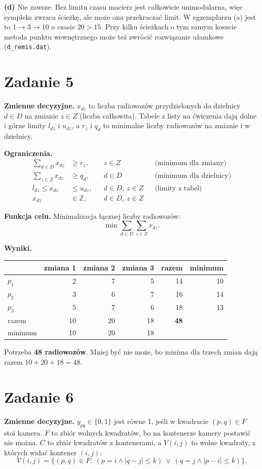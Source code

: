 \documentclass[11pt,a4paper]{article}
\begin{document}
\textbf{(d)} Nie zawsze. Bez limitu czasu macierz jest całkowicie unimodularna, więc sympleks zwraca ścieżkę, ale może ona przekraczać limit. W egzemplarzu (a) jest to $1\to3\to10$ o czasie $20>15$. Przy kilku ścieżkach o tym samym koszcie metoda punktu wewnętrznego może też zwrócić rozwiązanie ułamkowe (\texttt{d\_remis.dat}).

\section*{Zadanie 5}
\textbf{Zmienne decyzyjne.} $x_{dz}$ to liczba radiowozów przydzielonych do dzielnicy $d\in D$ na zmianie $z\in Z$ (liczba całkowita).
Tabele z listy na ćwiczenia dają dolne i górne limity $l_{dz}$ i $u_{dz}$, a $r_z$ i $q_d$ to minimalne liczby radiowozów na zmianie i w dzielnicy.

\textbf{Ograniczenia.}
\begin{align*}
\sum_{d\in D} x_{dz} &\ge r_z, && z\in Z && \text{(minimum dla zmiany)}\\
\sum_{z\in Z} x_{dz} &\ge q_d, && d\in D && \text{(minimum dla dzielnicy)}\\
l_{dz}\le x_{dz} &\le u_{dz}, && d\in D,\ z\in Z && \text{(limity z tabel)}\\
x_{dz} &\in\mathbb{Z}, && d\in D,\ z\in Z
\end{align*}

\textbf{Funkcja celu.} Minimalizacja łącznej liczby radiowozów:
\[ \min \sum_{d\in D}\sum_{z\in Z} x_{dz}. \]

\textbf{Wyniki.}
\begin{center}
\begin{tabular}{@{}lrrrrr@{}}
\toprule
 & zmiana 1 & zmiana 2 & zmiana 3 & razem & minimum \\ \midrule
$p_1$ & 2 & 7 & 5 & 14 & 10 \\
$p_2$ & 3 & 6 & 7 & 16 & 14 \\
$p_3$ & 5 & 7 & 6 & 18 & 13 \\ \midrule
razem & 10 & 20 & 18 & \textbf{48} & \\
minimum & 10 & 20 & 18 & & \\
\bottomrule
\end{tabular}
\end{center}

Potrzeba \textbf{48 radiowozów}. Mniej być nie może, bo minima dla trzech zmian dają razem $10+20+18=48$.

\section*{Zadanie 6}
\textbf{Zmienne decyzyjne.} $y_{pq}\in\{0,1\}$ jest równe 1, jeśli w kwadracie $(p,q)\in F$ stoi kamera. $F$ to zbiór wolnych kwadratów, bo na kontenerze kamery postawić nie można.
$C$ to zbiór kwadratów z kontenerami, a $V(i,j)$ to wolne kwadraty, z których widać kontener $(i,j)$:
\[ V(i,j)=\{(p,q)\in F:\ (p=i\wedge|q-j|\le k)\ \vee\ (q=j\wedge|p-i|\le k)\}. \]
\end{document}
